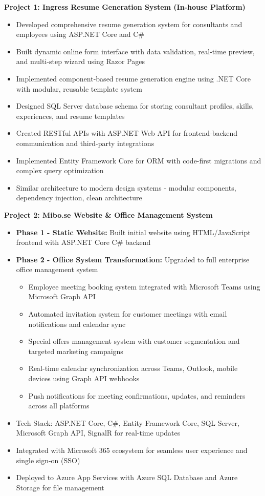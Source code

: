 \documentclass[11pt,a4paper]{article}
\begin{document}
\textbf{Project 1: Ingress Resume Generation System (In-house Platform)}
\begin{itemize}[leftmargin=*, itemsep=2pt]
\item Developed comprehensive resume generation system for consultants and employees using ASP.NET Core and C\#
\item Built dynamic online form interface with data validation, real-time preview, and multi-step wizard using Razor Pages
\item Implemented component-based resume generation engine using .NET Core with modular, reusable template system
\item Designed SQL Server database schema for storing consultant profiles, skills, experiences, and resume templates
\item Created RESTful APIs with ASP.NET Web API for frontend-backend communication and third-party integrations
\item Implemented Entity Framework Core for ORM with code-first migrations and complex query optimization
\item Similar architecture to modern design systems - modular components, dependency injection, clean architecture
\end{itemize}

\textbf{Project 2: Mibo.se Website \& Office Management System}
\begin{itemize}[leftmargin=*, itemsep=2pt]
\item \textbf{Phase 1 - Static Website:} Built initial website using HTML/JavaScript frontend with ASP.NET Core C\# backend
\item \textbf{Phase 2 - Office System Transformation:} Upgraded to full enterprise office management system
  \begin{itemize}[leftmargin=*, itemsep=1pt]
  \item Employee meeting booking system integrated with Microsoft Teams using Microsoft Graph API
  \item Automated invitation system for customer meetings with email notifications and calendar sync
  \item Special offers management system with customer segmentation and targeted marketing campaigns
  \item Real-time calendar synchronization across Teams, Outlook, mobile devices using Graph API webhooks
  \item Push notifications for meeting confirmations, updates, and reminders across all platforms
  \end{itemize}
\item Tech Stack: ASP.NET Core, C\#, Entity Framework Core, SQL Server, Microsoft Graph API, SignalR for real-time updates
\item Integrated with Microsoft 365 ecosystem for seamless user experience and single sign-on (SSO)
\item Deployed to Azure App Services with Azure SQL Database and Azure Storage for file management
\end{itemize}
\end{document}
